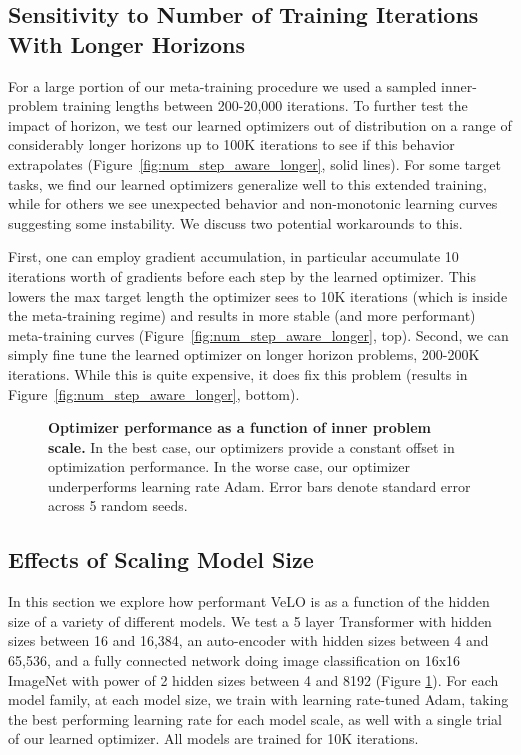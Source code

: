 \documentclass[11pt]{article}
\begin{document}
\subsection{Sensitivity to Number of Training Iterations With Longer Horizons}
For a large portion of our meta-training procedure we used a sampled inner-problem training lengths between 200-20,000 iterations.
To further test the impact of horizon, we test our learned optimizers out of distribution on a range of considerably longer horizons up to 100K iterations to see if this behavior extrapolates (Figure~\ref{fig:num_step_aware_longer}, solid lines).
For some target tasks, we find our learned optimizers generalize well to this extended training, while for others we see unexpected behavior and non-monotonic learning curves suggesting some instability. We discuss two potential workarounds to this.

First, one can employ gradient accumulation, in particular accumulate 10 iterations worth of gradients before each step by the learned optimizer.
This lowers the max target length the optimizer sees to 10K iterations (which is inside the meta-training regime) and results in more stable (and more performant) meta-training curves (Figure~\ref{fig:num_step_aware_longer}, top).
Second, we can simply fine tune the learned optimizer on longer horizon problems, 200-200K iterations. While this is quite expensive, it does fix this problem (results in Figure~\ref{fig:num_step_aware_longer}, bottom).


\begin{figure}[t!]
    \centering
    \caption{\textbf{Optimizer performance as a function of inner problem scale.} In the best case, our optimizers provide a constant offset in optimization performance. In the worse case, our optimizer underperforms learning rate Adam. Error bars denote standard error across 5 random seeds.
    \label{fig:param_scaling}
    }
\end{figure}


\subsection{Effects of Scaling Model Size}
In this section we explore how performant VeLO is as a function of the hidden size of a variety of different models.
We test a 5 layer Transformer with hidden sizes between 16 and 16,384, an auto-encoder with hidden sizes between 4 and 65,536, and a fully connected network doing image classification on 16x16 ImageNet with power of 2 hidden sizes between 4 and 8192 (Figure \ref{fig:param_scaling}).
For each model family, at each model size, we train with learning rate-tuned Adam, taking the best performing learning rate for each model scale, as well with a single trial of our learned optimizer.
All models are trained for 10K iterations.
\end{document}
